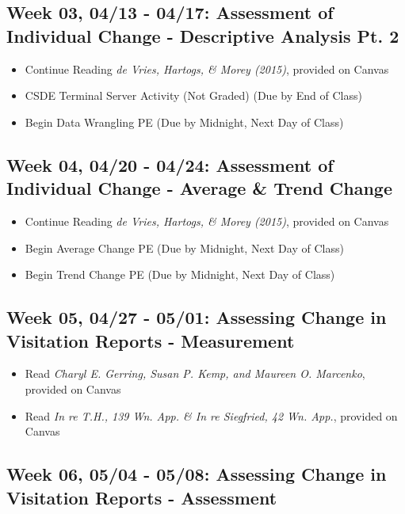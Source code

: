\documentclass[11pt,]{article}
\providecommand{\tightlist}{%
  \setlength{\itemsep}{0pt}\setlength{\parskip}{0pt}}
\begin{document}
\subsection{Week 03, 04/13 - 04/17: Assessment of Individual Change -
Descriptive Analysis Pt.
2}\label{week-03-0413---0417-assessment-of-individual-change---descriptive-analysis-pt.-2}

\begin{itemize}
\tightlist
\item
  Continue Reading \emph{de Vries, Hartogs, \& Morey (2015)}, provided
  on Canvas
\item
  CSDE Terminal Server Activity (Not Graded) (Due by End of Class)
\item
  Begin Data Wrangling PE (Due by Midnight, Next Day of Class)
\end{itemize}

\subsection{Week 04, 04/20 - 04/24: Assessment of Individual Change -
Average \& Trend
Change}\label{week-04-0420---0424-assessment-of-individual-change---average-trend-change}

\begin{itemize}
\tightlist
\item
  Continue Reading \emph{de Vries, Hartogs, \& Morey (2015)}, provided
  on Canvas
\item
  Begin Average Change PE (Due by Midnight, Next Day of Class)
\item
  Begin Trend Change PE (Due by Midnight, Next Day of Class)
\end{itemize}

\subsection{Week 05, 04/27 - 05/01: Assessing Change in Visitation
Reports -
Measurement}\label{week-05-0427---0501-assessing-change-in-visitation-reports---measurement}

\begin{itemize}
\tightlist
\item
  Read \emph{Charyl E. Gerring, Susan P. Kemp, and Maureen O. Marcenko},
  provided on Canvas
\item
  Read \emph{In re T.H., 139 Wn. App. \& In re Siegfried, 42 Wn. App.},
  provided on Canvas
\end{itemize}

\subsection{Week 06, 05/04 - 05/08: Assessing Change in Visitation
Reports -
Assessment}\label{week-06-0504---0508-assessing-change-in-visitation-reports---assessment}
\end{document}
